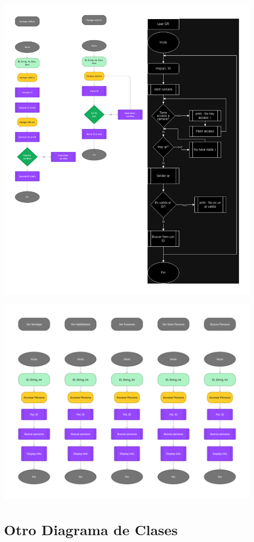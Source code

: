 \documentclass[a4paper,twoside,10pt]{report}
\begin{document}
\includegraphics[width=1.0\textwidth]{GamingDiagrama2.png}

\includegraphics[width=1.0\textwidth]{DiagramaGaming3.png}

\section{Otro Diagrama de Clases}
\end{document}
